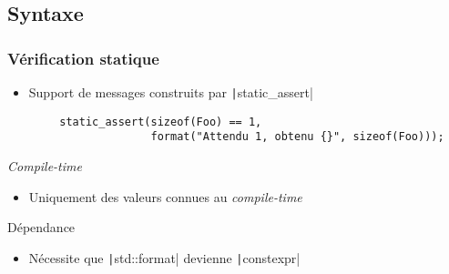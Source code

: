 \documentclass[C++.tex]{subfiles}
\begin{document}
\subsection*{Syntaxe}
\begin{frame}[fragile]
	\frametitle{Vérification statique}
	\begin{itemize}
		\item Support de messages construits par \texttt|static_assert|
	\end{itemize}

	\begin{verbatim}
		static_assert(sizeof(Foo) == 1,
		              format("Attendu 1, obtenu {}", sizeof(Foo)));
	\end{verbatim}

	\begin{alertblock}{\textit{Compile-time}}
		\begin{itemize}
			\item Uniquement des valeurs connues au \textit{compile-time}
		\end{itemize}
	\end{alertblock}

	\begin{alertblock}{Dépendance}
		\begin{itemize}
			\item Nécessite que \texttt|std::format| devienne \texttt|constexpr|
		\end{itemize}
	\end{alertblock}

\end{frame}
\end{document}
